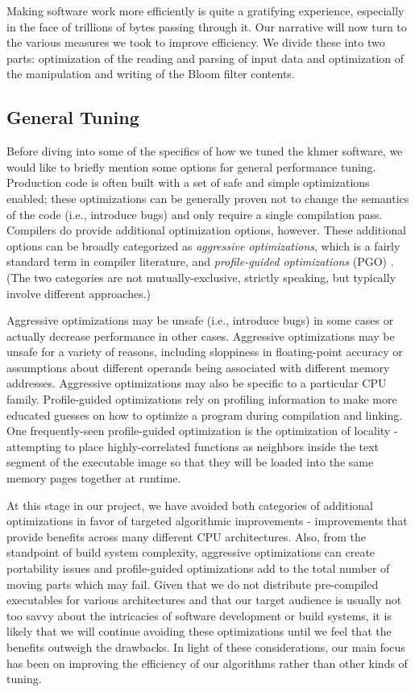 \documentclass{article}
\begin{document}
Making software work more efficiently is quite a gratifying experience,
especially in the face of trillions of bytes passing through it. Our narrative
will now turn to the various measures we took to improve efficiency. We
divide these into two parts: optimization of the reading and parsing of input
data and optimization of the manipulation and writing of the Bloom filter
contents.

\subsection{General Tuning}

Before diving into some of the specifics of how we tuned the khmer software, we
would like to briefly mention some options for general performance tuning.
Production code is often built with a set of safe and simple optimizations
enabled; these optimizations can be generally proven not to change the
semantics of the code (i.e., introduce bugs) and only require a single
compilation pass. Compilers do provide additional optimization options,
however. These additional options can be broadly categorized as
\textit{aggressive optimizations}, which is a fairly standard term in compiler
literature, and \textit{profile-guided optimizations} (PGO) \cite{web:PGO}.
(The two categories are not mutually-exclusive, strictly speaking, but
typically involve different approaches.)

Aggressive optimizations may be unsafe (i.e., introduce bugs) in some cases or
actually decrease performance in other cases. Aggressive optimizations may be
unsafe for a variety of reasons, including sloppiness in floating-point
accuracy or assumptions about different operands being associated with
different memory addresses. Aggressive optimizations may also be specific to a
particular CPU family. Profile-guided optimizations rely on profiling
information to make more educated guesses on how to optimize a program during
compilation and linking.  One frequently-seen profile-guided optimization is
the optimization of locality - attempting to place highly-correlated functions
as neighbors inside the text segment of the executable image so that they will
be loaded into the same memory pages together at runtime.

At this stage in our project, we have avoided both categories of additional
optimizations in favor of targeted algorithmic improvements - improvements that
provide benefits across many different CPU architectures.  Also, from the
standpoint of build system complexity, aggressive optimizations can create
portability issues and profile-guided optimizations add to the total number of
moving parts which may fail. Given that we do not distribute pre-compiled
executables for various architectures and that our target audience is usually
not too savvy about the intricacies of software development or build systems,
it is likely that we will continue avoiding these optimizations until we feel
that the benefits outweigh the drawbacks. In light of these considerations, our
main focus has been on improving the efficiency of our algorithms rather than
other kinds of tuning.
\end{document}

